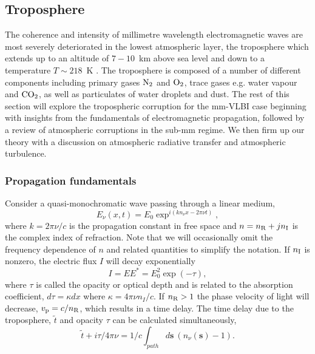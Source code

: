 \subsection{Troposphere}

The coherence and intensity of millimetre wavelength electromagnetic waves are most severely deteriorated in the lowest atmospheric layer, the troposphere which extends up to an altitude of $7-10$~km above sea level and down to a temperature $T \sim 218$~K \citep{Thompson_2001}. The troposphere is composed of a number of different components including primary gases $\rm N_2$ and  $\rm O_2$, trace gases e.g. water vapour and ${\rm CO_2}$, as well as particulates of water droplets and dust. The rest of this section will explore the tropospheric corruption for the mm-VLBI case beginning with insights from the fundamentals of electromagnetic propagation, followed by a review of atmospheric corruptions in the sub-mm regime. We then firm up our theory with a discussion on atmospheric radiative transfer and atmospheric turbulence. 


\subsubsection{Propagation fundamentals}\label{sec:prop_fund}
Consider a quasi-monochromatic wave passing through a linear medium,
\begin{equation}
E_\nu(x,t) = E_0 \exp^{i(kn_\nu x - 2\pi\nu t)},
\end{equation}		
where $k=2\pi \nu/c$ is the propagation constant in free space and $n= n_{\rm R} + j n_{\rm I}$ is the complex index of refraction. Note that we will occasionally omit the frequency dependence of $n$ and related quantities to simplify the notation. If $n_{\rm I}$ is nonzero, the electric flux $I$ will decay exponentially
\begin{equation}
I = EE^\ast = E_0^2 \exp(-\tau),
\end{equation}
where $\tau$ is called the opacity or optical depth and is related to the absorption coefficient, $d\tau = \kappa dx$ where $\kappa = 4\pi \nu n_I/c$. If $n_{\rm R} > 1 $ the phase velocity of light will decrease, $v_{\rm p} = c/n_{\rm R}$, which results in a time delay. The time delay due to the troposphere, $\tilde{t}$ and opacity $\tau$ can be calculated simultaneously,
\begin{equation}\label{timedelay}
\tilde{t} + i \tau /4\pi \nu =1/c \int_{path} d\bm{s}\  (n_\nu(\bm{s}) -1).
\end{equation}

